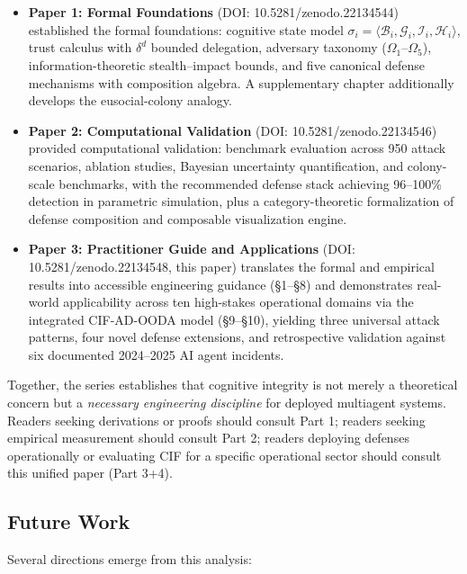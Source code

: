 \documentclass[
]{article}
\providecommand{\tightlist}{%
  \setlength{\itemsep}{0pt}\setlength{\parskip}{0pt}}
\begin{document}
\begin{itemize}
\tightlist
\item
  \textbf{Paper 1: Formal Foundations} \cite{friedman2026cogsec1} (DOI:
  10.5281/zenodo.22134544) established the formal foundations: cognitive
  state model
  \(\sigma_i = \langle \mathcal{B}_i, \mathcal{G}_i, \mathcal{I}_i, \mathcal{H}_i \rangle\),
  trust calculus with \(\delta^d\) bounded delegation, adversary
  taxonomy (\(\Omega_1\)--\(\Omega_5\)), information-theoretic
  stealth--impact bounds, and five canonical defense mechanisms with
  composition algebra. A supplementary chapter additionally develops the
  eusocial-colony analogy.
\item
  \textbf{Paper 2: Computational Validation} \cite{friedman2026cogsec2}
  (DOI: 10.5281/zenodo.22134546) provided computational validation:
  benchmark evaluation across 950 attack scenarios, ablation studies,
  Bayesian uncertainty quantification, and colony-scale benchmarks, with
  the recommended defense stack achieving 96--100\% detection in
  parametric simulation, plus a category-theoretic formalization of
  defense composition and composable visualization engine.
\item
  \textbf{Paper 3: Practitioner Guide and Applications}
  \cite{friedman2026cogsec3} (DOI: 10.5281/zenodo.22134548, this paper)
  translates the formal and empirical results into accessible
  engineering guidance (§1--§8) and demonstrates real-world
  applicability across ten high-stakes operational domains via the
  integrated CIF-AD-OODA model (§9--§10), yielding three universal
  attack patterns, four novel defense extensions, and retrospective
  validation against six documented 2024--2025 AI agent incidents.
\end{itemize}

Together, the series establishes that cognitive integrity is not merely
a theoretical concern but a \emph{necessary engineering discipline} for
deployed multiagent systems. Readers seeking derivations or proofs
should consult Part 1; readers seeking empirical measurement should
consult Part 2; readers deploying defenses operationally or evaluating
CIF for a specific operational sector should consult this unified paper
(Part 3+4).

\subsection{Future Work}\label{future-work}

Several directions emerge from this analysis:
\end{document}
